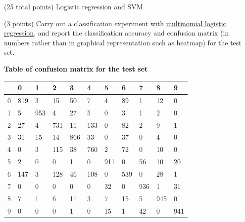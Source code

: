 \documentclass[12pt]{article}
\begin{document}
\begin{question}{(25 total points) Logistic regression and SVM}

  


  \medskip
   \begin{subquestion}{(3 points)
       Carry out a classification experiment with
       \href{https://scikit-learn.org/0.19/modules/generated/sklearn.linear\_model.LogisticRegression.html}{multinomial logistic regression},
       and report the classification accuracy and confusion matrix (in
       numbers rather than in graphical representation such as heatmap)
       for the test set.
     } \label{Q2.1}


   

      \begin{answerbox}{30em}
        
        \textbf{Table of confusion matrix for the test set}
        \medskip
        \centering
        \small
        \begin{tabular}{@{}lllllllllll@{}}
        \toprule
             & 0 & 1 & 2 & 3 & 4 & 5 & 6 & 7 & 8 & 9 \\ \midrule
            0 & 819 & 3 & 15 & 50 & 7 & 4 & 89 & 1 & 12 & 0 \\ 
            1 & 5 & 953 & 4 & 27 & 5 & 0 & 3 & 1 & 2 & 0 \\ 
            2 & 27 & 4 & 731 & 11 & 133 & 0 & 82 & 2 & 9 & 1 \\ 
            3 & 31 & 15 & 14 & 866 & 33 & 0 & 37 & 0 & 4 & 0 \\ 
            4 & 0 & 3 & 115 & 38 & 760 & 2 & 72 & 0 & 10 & 0 \\ 
            5 & 2 & 0 & 0 & 1 & 0 & 911 & 0 & 56 & 10 & 20 \\ 
            6 & 147 & 3 & 128 & 46 & 108 & 0 & 539 & 0 & 28 & 1 \\ 
            7 & 0 & 0 & 0 & 0 & 0 & 32 & 0 & 936 & 1 & 31 \\ 
            8 & 7 & 1 & 6 & 11 & 3 & 7 & 15 & 5 & 945 & 0 \\ 
            9 & 0 & 0 & 0 & 1 & 0 & 15 & 1 & 42 & 0 & 941 \\ \bottomrule 
        \end{tabular}


\end{answerbox}
\end{subquestion}
\end{question}
\end{document}

